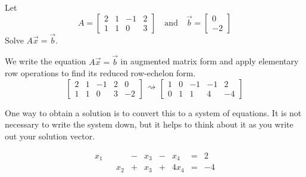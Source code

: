 \documentclass{ximera}
\begin{document}
\begin{example}\label{ex:solveAxequalb}
Let $$A=\begin{bmatrix}2&1&-1&2\\1&1&0&3\end{bmatrix}\quad\text{and}\quad\vec{b}=\begin{bmatrix}0\\-2\end{bmatrix} $$
Solve $A\vec{x}=\vec{b}$.
\begin{explanation}
We write the equation $A\vec{x}=\vec{b}$ in augmented matrix form and apply elementary row operations to find its reduced row-echelon form.
$$\left[\begin{array}{cccc|c}  
 2&1&-1&2&0\\1&1&0&3&-2
 \end{array}\right]\begin{array}{c}
 \\
 \rightsquigarrow\\
 \\
 \end{array}\left[\begin{array}{cccc|c}  
 1&0&-1&-1&2\\0&1&1&4&-4
 \end{array}\right]$$
 
One way to obtain a solution is to convert this to a system of equations.  It is not necessary to write the system down, but it helps to think about it as you write out your solution vector. 

$$\begin{array}{ccccccccc}
      x_1 & &&-&x_3&-&x_4&= &2 \\
	 & &x_2&+&x_3&+&4x_4&=&-4
        \end{array}$$
        

\end{explanation}
\end{example}
\end{document}
